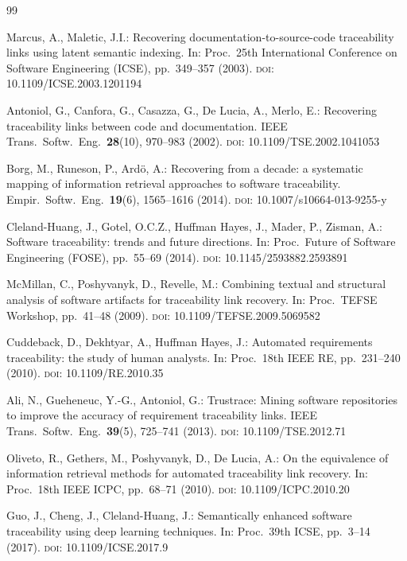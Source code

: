 \documentclass{sn-jnl}
\begin{document}
\begin{thebibliography}{99}

Marcus, A., Maletic, J.I.: Recovering documentation-to-source-code traceability links using latent semantic indexing. In: Proc.\ 25th International Conference on Software Engineering (ICSE), pp.\ 349--357 (2003). \textsc{doi}: 10.1109/ICSE.2003.1201194

Antoniol, G., Canfora, G., Casazza, G., De Lucia, A., Merlo, E.: Recovering traceability links between code and documentation. IEEE Trans.\ Softw.\ Eng.\ \textbf{28}(10), 970--983 (2002). \textsc{doi}: 10.1109/TSE.2002.1041053

Borg, M., Runeson, P., Ard\"o, A.: Recovering from a decade: a systematic mapping of information retrieval approaches to software traceability. Empir.\ Softw.\ Eng.\ \textbf{19}(6), 1565--1616 (2014). \textsc{doi}: 10.1007/s10664-013-9255-y

Cleland-Huang, J., Gotel, O.C.Z., Huffman Hayes, J., Mader, P., Zisman, A.: Software traceability: trends and future directions. In: Proc.\ Future of Software Engineering (FOSE), pp.\ 55--69 (2014). \textsc{doi}: 10.1145/2593882.2593891

McMillan, C., Poshyvanyk, D., Revelle, M.: Combining textual and structural analysis of software artifacts for traceability link recovery. In: Proc.\ TEFSE Workshop, pp.\ 41--48 (2009). \textsc{doi}: 10.1109/TEFSE.2009.5069582

Cuddeback, D., Dekhtyar, A., Huffman Hayes, J.: Automated requirements traceability: the study of human analysts. In: Proc.\ 18th IEEE RE, pp.\ 231--240 (2010). \textsc{doi}: 10.1109/RE.2010.35

Ali, N., Gueheneuc, Y.-G., Antoniol, G.: Trustrace: Mining software repositories to improve the accuracy of requirement traceability links. IEEE Trans.\ Softw.\ Eng.\ \textbf{39}(5), 725--741 (2013). \textsc{doi}: 10.1109/TSE.2012.71

Oliveto, R., Gethers, M., Poshyvanyk, D., De Lucia, A.: On the equivalence of information retrieval methods for automated traceability link recovery. In: Proc.\ 18th IEEE ICPC, pp.\ 68--71 (2010). \textsc{doi}: 10.1109/ICPC.2010.20

Guo, J., Cheng, J., Cleland-Huang, J.: Semantically enhanced software traceability using deep learning techniques. In: Proc.\ 39th ICSE, pp.\ 3--14 (2017). \textsc{doi}: 10.1109/ICSE.2017.9


\end{thebibliography}
\end{document}
